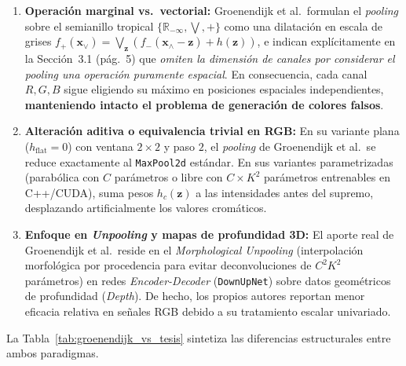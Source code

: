 \documentclass[10pt,a4paper,twocolumn]{article}
\begin{document}
\begin{enumerate}[leftmargin=*,nosep]
  \item \textbf{Operación marginal vs.\ vectorial:} Groenendijk et al.\ formulan el \emph{pooling} sobre el semianillo tropical $\{\mathbb{R}_{-\infty}, \bigvee, +\}$ como una dilatación en escala de grises $f_+(\mathbf{x}_\vee) = \bigvee_{\mathbf{z}} (f_-(\mathbf{x}_\wedge - \mathbf{z}) + h(\mathbf{z}))$, e indican explícitamente en la Sección~3.1 (pág.~5) que \emph{omiten la dimensión de canales por considerar el pooling una operación puramente espacial}. En consecuencia, cada canal $R, G, B$ sigue eligiendo su máximo en posiciones espaciales independientes, \textbf{manteniendo intacto el problema de generación de colores falsos}.
  \item \textbf{Alteración aditiva o equivalencia trivial en RGB:} En su variante plana ($h_{\text{flat}} = 0$) con ventana $2\times2$ y paso $2$, el \emph{pooling} de Groenendijk et al.\ se reduce exactamente al \texttt{MaxPool2d} estándar. En sus variantes parametrizadas (parabólica con $C$ parámetros o libre con $C\times K^2$ parámetros entrenables en C++/CUDA), suma pesos $h_c(\mathbf{z})$ a las intensidades antes del supremo, desplazando artificialmente los valores cromáticos.
  \item \textbf{Enfoque en \emph{Unpooling} y mapas de profundidad 3D:} El aporte real de Groenendijk et al.\ reside en el \emph{Morphological Unpooling} (interpolación morfológica por procedencia para evitar deconvoluciones de $C^2 K^2$ parámetros) en redes \emph{Encoder-Decoder} (\texttt{DownUpNet}) sobre datos geométricos de profundidad (\emph{Depth}). De hecho, los propios autores reportan menor eficacia relativa en señales RGB debido a su tratamiento escalar univariado.
\end{enumerate}

La Tabla~\ref{tab:groenendijk_vs_tesis} sintetiza las diferencias estructurales entre ambos paradigmas.
\end{document}
